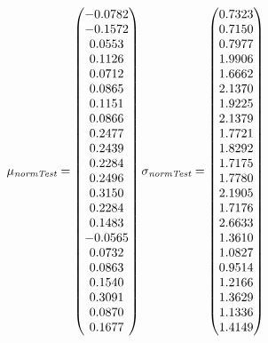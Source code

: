 \documentclass[a4paper, 11pt]{article}
\begin{document}
\begin{equation*}
\mu_{\textit{normTest}} = \begin{pmatrix}
   -0.0782 \\
   -0.1572 \\
    0.0553 \\
    0.1126 \\
    0.0712 \\
    0.0865 \\
    0.1151 \\
    0.0866 \\
    0.2477 \\
    0.2439 \\
    0.2284 \\
    0.2496 \\
    0.3150 \\
    0.2284 \\
    0.1483 \\
   -0.0565 \\
    0.0732 \\
    0.0863 \\
    0.1540 \\
    0.3091 \\
    0.0870 \\
    0.1677 \\
    \end{pmatrix} \\    
\sigma_{\textit{normTest}} = \begin{pmatrix}
    0.7323 \\
    0.7150 \\
    0.7977 \\
    1.9906 \\
    1.6662 \\
    2.1370 \\
    1.9225 \\
    2.1379 \\
    1.7721 \\
    1.8292 \\
    1.7175 \\
    1.7780 \\
    2.1905 \\
    1.7176 \\
    2.6633 \\
    1.3610 \\
    1.0827 \\
    0.9514 \\
    1.2166 \\
    1.3629 \\
    1.1336 \\
    1.4149 \\
\end{pmatrix}
\end{equation*}
\end{document}
